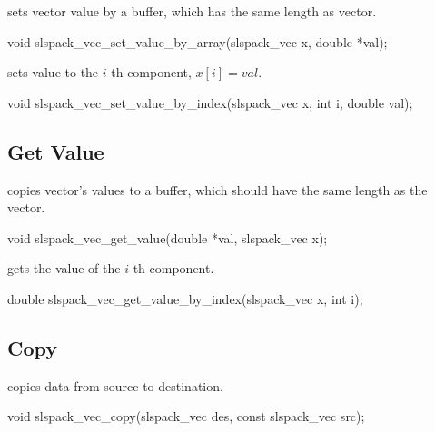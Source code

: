  sets vector value by a buffer, which has the same length as
vector.
\begin{evb}
void slspack_vec_set_value_by_array(slspack_vec x, double *val);
\end{evb}

 sets value to the $i$-th component, $x[i] = val$.
\begin{evb}
void slspack_vec_set_value_by_index(slspack_vec x, int i, double val);
\end{evb}

\subsection{Get Value}
 copies vector's values to a buffer, which should have the same length as
the vector.
\begin{evb}
void slspack_vec_get_value(double *val, slspack_vec x);
\end{evb}

 gets the value of the $i$-th component.
\begin{evb}
double slspack_vec_get_value_by_index(slspack_vec x, int i);
\end{evb}

\subsection{Copy}
 copies data from source to destination.
\begin{evb}
void slspack_vec_copy(slspack_vec des, const slspack_vec src);
\end{evb}
